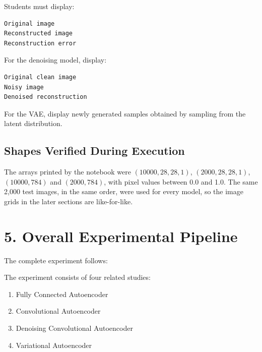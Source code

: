 \documentclass[10pt]{article}
\begin{document}
Students must display:

\begin{verbatim}
Original image
Reconstructed image
Reconstruction error
\end{verbatim}

For the denoising model, display:

\begin{verbatim}
Original clean image
Noisy image
Denoised reconstruction
\end{verbatim}

For the VAE, display newly generated samples obtained by sampling from the
latent distribution.

\subsection*{Shapes Verified During Execution}

The arrays printed by the notebook were $(10000,28,28,1)$, $(2000,28,28,1)$,
$(10000,784)$ and $(2000,784)$, with pixel values between 0.0 and 1.0. The same
2,000 test images, in the same order, were used for every model, so the image
grids in the later sections are like-for-like.

\section*{5. Overall Experimental Pipeline}

The complete experiment follows:

\begin{center}
\end{center}

The experiment consists of four related studies:

\begin{enumerate}
\item Fully Connected Autoencoder
\item Convolutional Autoencoder
\item Denoising Convolutional Autoencoder
\item Variational Autoencoder
\end{enumerate}
\end{document}

